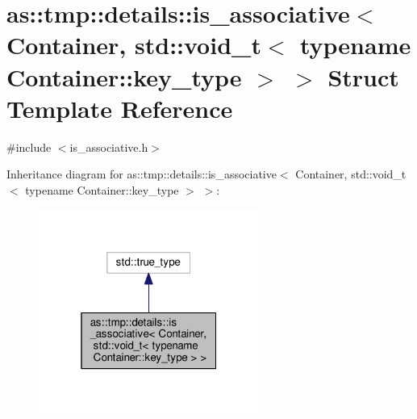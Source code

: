 \hypertarget{structas_1_1tmp_1_1details_1_1is__associative_3_01Container_00_01std_1_1void__t_3_01typename_01Container_1_1key__type_01_4_01_4}{}\section{as\+:\+:tmp\+:\+:details\+:\+:is\+\_\+associative$<$ Container, std\+:\+:void\+\_\+t$<$ typename Container\+:\+:key\+\_\+type $>$ $>$ Struct Template Reference}
\label{structas_1_1tmp_1_1details_1_1is__associative_3_01Container_00_01std_1_1void__t_3_01typename_01Container_1_1key__type_01_4_01_4}


{\ttfamily \#include $<$is\+\_\+associative.\+h$>$}



Inheritance diagram for as\+:\+:tmp\+:\+:details\+:\+:is\+\_\+associative$<$ Container, std\+:\+:void\+\_\+t$<$ typename Container\+:\+:key\+\_\+type $>$ $>$\+:\nopagebreak
\begin{figure}[H]
\begin{center}
\leavevmode
\includegraphics[width=205pt]{structas_1_1tmp_1_1details_1_1is__associative_3_01Container_00_01std_1_1void__t_3_01typename_01C611a54dcc77bf996638028d6bc5cb78d}
\end{center}
\end{figure}


